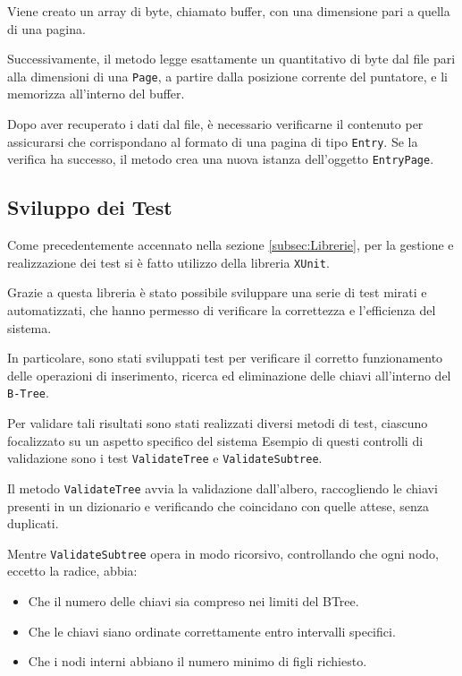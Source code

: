 \documentclass[12pt,a4paper,openright,twoside]{book}
\begin{document}
                    Viene creato un array di byte, chiamato buffer, con una dimensione pari a quella di una pagina.

                    Successivamente, il metodo legge esattamente un quantitativo di byte dal file pari alla dimensioni di una \texttt{Page}, a partire dalla posizione corrente del puntatore, e li memorizza all'interno del buffer.

                    Dopo aver recuperato i dati dal file, è necessario verificarne il contenuto per assicurarsi che corrispondano al formato di una pagina di tipo \texttt{Entry}. Se la verifica ha successo, il metodo crea una nuova istanza dell'oggetto \texttt{EntryPage}.

                    

        \pagebreak

        \subsection{Sviluppo dei Test}

            Come precedentemente accennato nella sezione \cref{subsec:Librerie}, per la gestione e realizzazione dei test si è fatto utilizzo della libreria \texttt{XUnit}.

            Grazie a questa libreria è stato possibile sviluppare una serie di test mirati e automatizzati, che hanno permesso di verificare la correttezza e l'efficienza del sistema.

            In particolare, sono stati sviluppati test per verificare il corretto funzionamento delle operazioni di inserimento, ricerca ed eliminazione delle chiavi all'interno del \texttt{B-Tree}.

            Per validare tali risultati sono stati realizzati diversi metodi di test, ciascuno focalizzato su un aspetto specifico del sistema Esempio di questi controlli di validazione sono i test \texttt{ValidateTree} e \texttt{ValidateSubtree}.

            Il metodo \texttt{ValidateTree} avvia la validazione dall'albero, raccogliendo le chiavi presenti in un dizionario e verificando che coincidano con quelle attese, senza duplicati.

            Mentre \texttt{ValidateSubtree} opera in modo ricorsivo, controllando che ogni nodo, eccetto la radice, abbia:

            \begin{itemize}
                \item Che il numero delle chiavi sia compreso nei limiti del BTree.
                \item Che le chiavi siano ordinate correttamente entro intervalli specifici.
                \item Che i nodi interni abbiano il numero minimo di figli richiesto.
            \end{itemize}
\end{document}
